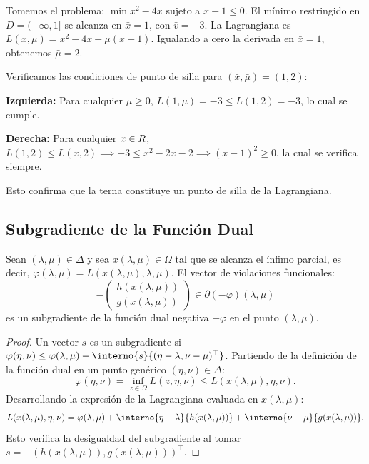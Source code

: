 \begin{example}\label{v1:exa:punto_silla_verificacion}
    Tomemos el problema: $\min x^2 - 4x$ sujeto a $x - 1 \le 0$. El mínimo restringido en $D = (-\infty, 1]$ se alcanza en $\bar{x} = 1$, con $\bar{v} = -3$. La Lagrangiana es $L(x, \mu) = x^2 - 4x + \mu(x - 1)$. Igualando a cero la derivada en $\bar{x} = 1$, obtenemos $\bar{\mu} = 2$.
    
    Verificamos las condiciones de punto de silla para $(\bar{x}, \bar{\mu}) = (1, 2)$:
    \begin{enuthm}
        \item \textbf{Izquierda:} Para cualquier $\mu \ge 0$, $L(1, \mu) = -3 \le L(1, 2) = -3$, lo cual se cumple.
        \item \textbf{Derecha:} Para cualquier $x \in R$, $L(1, 2) \le L(x, 2) \implies -3 \le x^2 - 2x - 2 \implies (x - 1)^2 \ge 0$, la cual se verifica siempre.
    \end{enuthm}
    Esto confirma que la terna constituye un punto de silla de la Lagrangiana.
\end{example}

\subsection{Subgradiente de la Función Dual}

\begin{proposition}\label{v1:prop:dual_subgradient}
    Sean $( \lambda, \mu) \in \Delta$ y sea $x( \lambda, \mu) \in \Omega$ tal que se alcanza el ínfimo parcial, es decir, $\varphi( \lambda, \mu) = L(x( \lambda, \mu), \lambda, \mu)$. El vector de violaciones funcionales:
    \begin{equation}
        -\begin{pmatrix} h(x( \lambda, \mu)) \\ g(x( \lambda, \mu)) \end{pmatrix} \in \partial (-\varphi)( \lambda, \mu)
    \end{equation}
    es un subgradiente de la función dual negativa $-\varphi$ en el punto $(\lambda, \mu)$.
\end{proposition}

\begin{proof}
    Un vector $s$ es un subgradiente si $\varphi(\eta, \nu) \le \varphi(\lambda, \mu) - \interno{s}{( \eta - \lambda , \nu - \mu )^\top}$. Partiendo de la definición de la función dual en un punto genérico $(\eta, \nu) \in \Delta$:
    \[
        \varphi( \eta, \nu) = \inf_{z \in \Omega} L(z, \eta, \nu) \le L(x( \lambda, \mu), \eta, \nu).
    \]
    Desarrollando la expresión de la Lagrangiana evaluada en $x( \lambda, \mu)$:
    \[
        L(x(\lambda, \mu), \eta, \nu) = \varphi(\lambda, \mu) + \interno{\eta - \lambda}{h(x( \lambda, \mu))} + \interno{\nu - \mu}{g(x( \lambda, \mu))}.
    \]
    Esto verifica la desigualdad del subgradiente al tomar $s = -(h(x( \lambda, \mu)), g(x( \lambda, \mu)))^\top$.
\end{proof}

